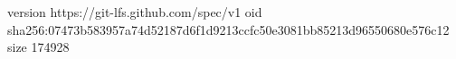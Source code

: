 version https://git-lfs.github.com/spec/v1
oid sha256:07473b583957a74d52187d6f1d9213ccfc50e3081bb85213d96550680e576c12
size 174928
